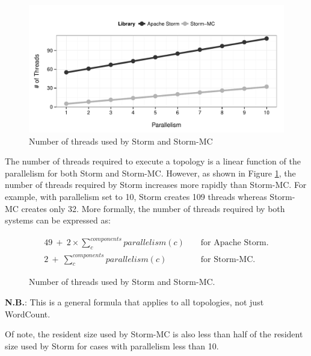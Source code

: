 \documentclass[bsc,logo,frontabs,twoside,singlespacing,normalheadings,parskip]{infthesis}\usepackage[]{graphicx}\usepackage[]{color}
\makeatletter
\def\maxwidth{ %
  \ifdim\Gin@nat@width>\linewidth
    \linewidth
  \else
    \Gin@nat@width
  \fi
}
\newenvironment{knitrout}{}{} %
\makeatother
\begin{document}
\begin{knitrout}
\color{fgcolor}\begin{figure}[!htb]

{\centering \includegraphics[width=\maxwidth]{figure/threads-plot-1} 

}

\caption[Number of threads used by Storm and Storm-MC]{Number of threads used by Storm and Storm-MC}\label{fig:threads-plot}
\end{figure}


\end{knitrout}

The number of threads required to execute a topology is a linear function of the parallelism for both Storm and Storm-MC. However, as shown in Figure \ref{fig:threads-plot}, the number of threads required by Storm increases more rapidly than Storm-MC. For example, with parallelism set to 10, Storm creates 109 threads whereas Storm-MC creates only 32. More formally, the number of threads required by both systems can be expressed as:

\begin{figure}[!htb]
\begin{eqnarray*}
	49 \ + \ 2 \times \sum\limits_{c}^{components} parallelism(c) && \text{ for Apache Storm.} \\
	2 \ + \ \sum\limits_{c}^{components} parallelism(c) && \text{ for Storm-MC.}
\end{eqnarray*}
\caption{Number of threads used by Storm and Storm-MC.}
\end{figure}

\textbf{N.B.}\@\xspace: This is a general formula that applies to all topologies, not just WordCount.

Of note, the resident size used by Storm-MC is also less than half of the resident size used by Storm for cases with parallelism less than 10.
\end{document}
